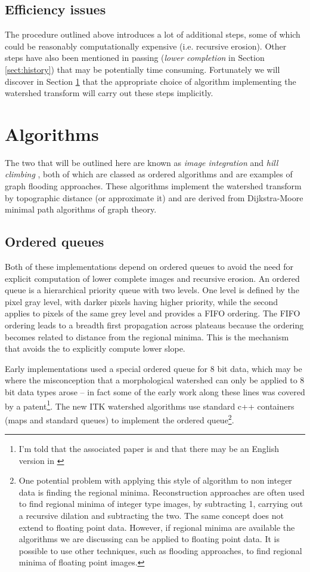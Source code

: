 \documentclass{InsightArticle}
\begin{document}
\subsection{Efficiency issues}
The procedure outlined above introduces a lot of additional steps,
some of which could be reasonably computationally expensive
(i.e. recursive erosion). Other steps have also been mentioned in
passing ({\em lower completion} in Section \ref{sect:history}) that may
be potentially time consuming. Fortunately we will discover in Section
\ref{sect:algorithms} that the appropriate choice of algorithm implementing the
watershed transform will carry out these steps implicitly.

\section{Algorithms}
\label{sect:algorithms}
The two that will be outlined here are known as {\em image
integration}\cite{Meyer1994a} and {\em hill climbing}
\cite{Beucher93a}, both of which are classed as ordered
algorithms and are examples of graph flooding approaches. These
algorithms implement the watershed transform by topographic distance
(or approximate it) and are derived from Dijkstra-Moore minimal path
algorithms of graph theory.

\subsection{Ordered queues}
Both of these implementations depend on ordered queues to avoid the
need for explicit computation of lower complete images and recursive
erosion. An ordered queue is a hierarchical priority queue with two
levels. One level is defined by the pixel gray level, with darker
pixels having higher priority, while the second applies to pixels of
the same grey level and provides a FIFO ordering. The FIFO ordering
leads to a breadth first propagation across plateaus because the
ordering becomes related to distance from the regional minima. This is
the mechanism that avoids the to explicitly compute lower slope.

Early implementations used a special ordered queue for 8 bit data,
which may be where the misconception that a morphological watershed
can only be applied to 8 bit data types arose -- in fact some of the
early work along these lines was covered by a patent\footnote{I'm told
that the associated paper is \cite{Meyer91a} and that there may be an
English version in \cite{Dougherty93a}}. The new ITK watershed
algorithms use standard c++ containers (maps and standard queues) to
implement the ordered queue\footnote{One potential problem with
applying this style of algorithm to non integer data is finding the
regional minima. Reconstruction approaches are often used to find
regional minima of integer type images, by subtracting 1, carrying out
a recursive dilation and subtracting the two. The same concept does
not extend to floating point data. However, if regional minima are
available the algorithms we are discussing can be applied to floating
point data. It is possible to use other techniques, such as flooding
approaches, to find regional minima of floating point images.}.
\end{document}
